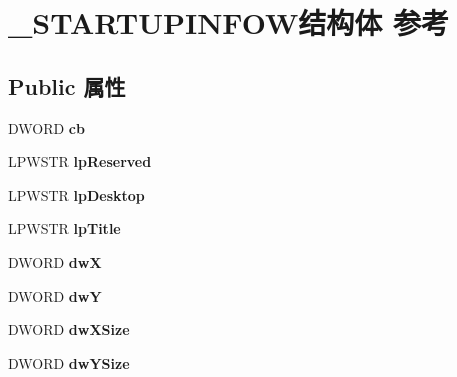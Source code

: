 \hypertarget{struct___s_t_a_r_t_u_p_i_n_f_o_w}{}\section{\+\_\+\+S\+T\+A\+R\+T\+U\+P\+I\+N\+F\+O\+W结构体 参考}
\label{struct___s_t_a_r_t_u_p_i_n_f_o_w}
\subsection*{Public 属性}
\begin{DoxyCompactItemize}
\item 
\mbox{\label{struct___s_t_a_r_t_u_p_i_n_f_o_w_a1582c731cb137eef6411d363b5639dce}} 
D\+W\+O\+RD {\bfseries cb}
\item 
\mbox{\label{struct___s_t_a_r_t_u_p_i_n_f_o_w_ae6f79e3aa976acda0b4ed8b0538890d8}} 
L\+P\+W\+S\+TR {\bfseries lp\+Reserved}
\item 
\mbox{\label{struct___s_t_a_r_t_u_p_i_n_f_o_w_a01ee6064234f2c8a732ace739922ed4c}} 
L\+P\+W\+S\+TR {\bfseries lp\+Desktop}
\item 
\mbox{\label{struct___s_t_a_r_t_u_p_i_n_f_o_w_a891279552f60ce9844b14d3408283f49}} 
L\+P\+W\+S\+TR {\bfseries lp\+Title}
\item 
\mbox{\label{struct___s_t_a_r_t_u_p_i_n_f_o_w_a51e18292ddb37432cf2b2cc0550f68d7}} 
D\+W\+O\+RD {\bfseries dwX}
\item 
\mbox{\label{struct___s_t_a_r_t_u_p_i_n_f_o_w_aa62d3c9292f8f9906b4fa6a1fdcbb563}} 
D\+W\+O\+RD {\bfseries dwY}
\item 
\mbox{\label{struct___s_t_a_r_t_u_p_i_n_f_o_w_a5ec8862f266c6e5f89f16f4488ab521c}} 
D\+W\+O\+RD {\bfseries dw\+X\+Size}
\item 
\mbox{\label{struct___s_t_a_r_t_u_p_i_n_f_o_w_a29b635cbc82e07cdd477319e6622ca6f}} 
D\+W\+O\+RD {\bfseries dw\+Y\+Size}

\end{DoxyCompactItemize}
